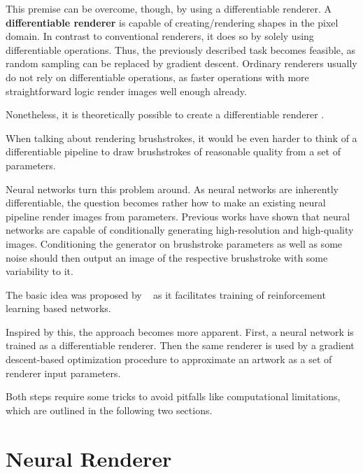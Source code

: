 This premise can be overcome, though, by using a differentiable renderer.
A \textbf{differentiable renderer} is capable of creating/rendering shapes in the pixel domain.
In contrast to conventional renderers, it does so by solely using differentiable operations.
Thus, the previously described task becomes feasible, as random sampling can be replaced by gradient descent.
Ordinary renderers usually do not rely on differentiable operations, as faster operations with more straightforward logic render images well enough already.

Nonetheless, it is theoretically possible to create a differentiable renderer \cite{something}.

When talking about rendering brushstrokes, it would be even harder to think of a differentiable pipeline to draw brushstrokes of reasonable quality from a set of parameters.

Neural networks turn this problem around.
As neural networks are inherently differentiable, the question becomes rather how to make an existing neural pipeline render images from parameters.
Previous works have shown that neural networks are capable of conditionally generating high-resolution and high-quality images.
Conditioning the generator on brushstroke parameters as well as some noise should then output an image of the respective brushstroke with some variability to it.

The basic idea was proposed by ~\cite{japanese neural renderer} as it facilitates training of reinforcement learning based networks.

Inspired by this, the approach becomes more apparent.
First, a neural network is trained as a differentiable renderer.
Then the same renderer is used by a gradient descent-based optimization procedure to approximate an artwork as a set of renderer input parameters.

Both steps require some tricks to avoid pitfalls like computational limitations, which are outlined in the following two sections.


\section{Neural Renderer}


